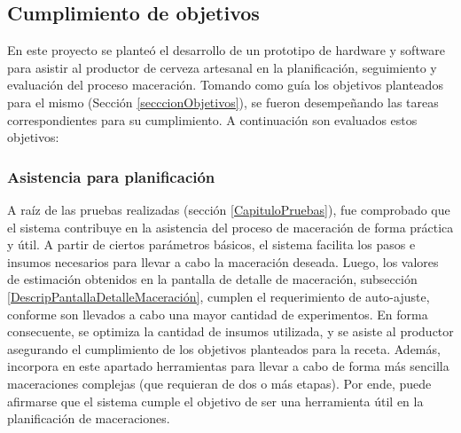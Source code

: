 \subsection{Cumplimiento de objetivos}

\par En este proyecto se planteó el desarrollo de un prototipo de hardware y software para asistir al productor de cerveza artesanal en la planificación, seguimiento y evaluación del proceso maceración. Tomando como guía los objetivos planteados para el mismo (Sección \ref{secccionObjetivos}), se fueron desempeñando las tareas correspondientes para su cumplimiento. A continuación son evaluados estos objetivos:

\subsubsection{Asistencia para planificación} 
\par A raíz de las pruebas realizadas (sección \ref{CapituloPruebas}), fue comprobado que el sistema contribuye en la asistencia del proceso de maceración de forma práctica y útil. A partir de ciertos parámetros básicos, el sistema facilita los pasos e insumos necesarios para llevar a cabo la maceración deseada. Luego, los valores de estimación obtenidos en la pantalla de detalle de maceración, subsección \ref{DescripPantallaDetalleMaceración}, cumplen el requerimiento de auto-ajuste, conforme son llevados a cabo una mayor cantidad de experimentos. En forma consecuente, se optimiza la cantidad de insumos utilizada, y se asiste al productor asegurando el cumplimiento de los objetivos planteados para la receta. Además, incorpora en este apartado herramientas para llevar a cabo de forma más sencilla maceraciones complejas (que requieran de dos o más etapas). Por ende, puede afirmarse que el sistema cumple el objetivo de ser una herramienta útil en la planificación de maceraciones.

